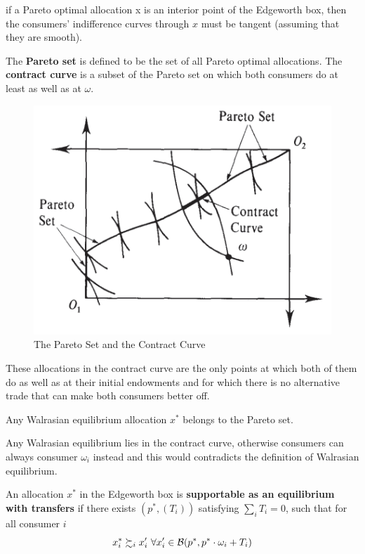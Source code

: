 \documentclass{report}
\begin{document}
		\begin{remark}
			if a Pareto optimal allocation x is an interior point of the Edgeworth box, then the consumers' indifference curves through $x$ must be tangent (assuming that they are smooth).
		\end{remark}
		
		\begin{definition}
			The \textbf{Pareto set} is defined to be the set of all Pareto optimal allocations. The \textbf{contract curve} is a subset of the Pareto set on which both consumers do at least as well as at $\omega$.
		\end{definition}
		
		\begin{figure}[h]
			\centering
			\includegraphics[width=0.4\linewidth]{figures/Pareto_contract}
			\caption{The Pareto Set and the Contract Curve}
		\end{figure}
		
		\begin{remark}
			These allocations in the contract curve are the only points at which both of them do as well as at their initial endowments and for which there is no alternative trade that can make both consumers better off.
		\end{remark}
		
		\begin{proposition}
			Any Walrasian equilibrium allocation $x^*$ belongs to the Pareto set.
		\end{proposition}
		
		\begin{proposition}
			Any Walrasian equilibrium lies in the contract curve, otherwise consumers can always consumer $\omega_i$ instead and this would contradicts the definition of Walrasian equilibrium.
		\end{proposition}
		
		\begin{definition}
			An allocation $x^*$ in the Edgeworth box is \textbf{supportable as an equilibrium with transfers} if there exists $(p^*, (T_i))$ satisfying $\sum_i T_i = 0$, such that for all consumer $i$
			\begin{equation}
				x_i^* \succsim_i x_i' \ \forall x_i' \in \mathcal{{B}}(p^*, p^*\cdot \omega_i + T_i)
			\end{equation}
		\end{definition}
		
\end{document}
